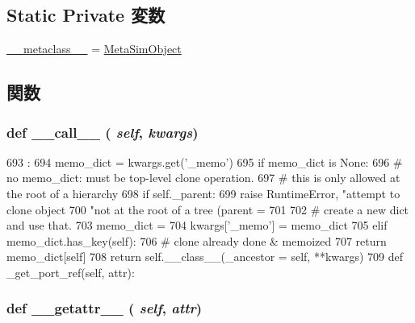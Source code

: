 \subsection*{Static Private 変数}
\begin{DoxyCompactItemize}
\item 
\hyperlink{classm5_1_1SimObject_1_1SimObject_adfc4d1824f4ecdcbb04ceafc5bbc933e}{\_\-\_\-metaclass\_\-\_\-} = \hyperlink{classm5_1_1SimObject_1_1MetaSimObject}{MetaSimObject}
\end{DoxyCompactItemize}


\subsection{関数}
\hypertarget{classm5_1_1SimObject_1_1SimObject_ae844e0019d38360a86bac1474132db3c}{
\subsubsection[{\_\-\_\-call\_\-\_\-}]{\setlength{\rightskip}{0pt plus 5cm}def \_\-\_\-call\_\-\_\- ( {\em self}, \/   {\em kwargs})}}
\label{classm5_1_1SimObject_1_1SimObject_ae844e0019d38360a86bac1474132db3c}



\begin{DoxyCode}
693                                 :
694         memo_dict = kwargs.get('_memo')
695         if memo_dict is None:
696             # no memo_dict: must be top-level clone operation.
697             # this is only allowed at the root of a hierarchy
698             if self._parent:
699                 raise RuntimeError, "attempt to clone object %
700                       "not at the root of a tree (parent = %
701                       %
702             # create a new dict and use that.
703             memo_dict = {}
704             kwargs['_memo'] = memo_dict
705         elif memo_dict.has_key(self):
706             # clone already done & memoized
707             return memo_dict[self]
708         return self.__class__(_ancestor = self, **kwargs)
709 
    def _get_port_ref(self, attr):
\end{DoxyCode}
\hypertarget{classm5_1_1SimObject_1_1SimObject_a0a990b3ec3889d40889daca9ee5e4695}{
\subsubsection[{\_\-\_\-getattr\_\-\_\-}]{\setlength{\rightskip}{0pt plus 5cm}def \_\-\_\-getattr\_\-\_\- ( {\em self}, \/   {\em attr})}}
\label{classm5_1_1SimObject_1_1SimObject_a0a990b3ec3889d40889daca9ee5e4695}




